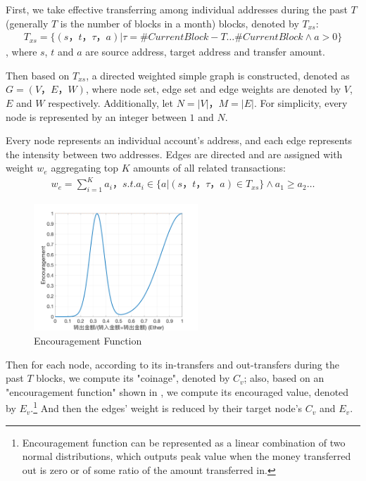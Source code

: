 First, we take effective transferring among  individual addresses during the past $T$ (generally $T$ is the number of blocks in a month) blocks, denoted by $T_{xs}$:
\begin{align}
T_{xs} = \{(s，t，\tau， a)| \tau = \#CurrentBlock-T \dots \#CurrentBlock \land a > 0 \}
\end{align}
, where $s$, $t$ and $a$ are source address, target address and transfer amount.

Then based on $T_{xs}$, a directed weighted simple graph is constructed, denoted as $G=(V， E， W)$, where node set, edge set and edge weights are denoted by $V$, $E$ and $W$ respectively. Additionally, let $N = |V|$，$M = |E|$. For simplicity, every node is represented by an integer between $1$ and $N$.

Every node represents an individual account's address, and each edge represents the intensity between two addresses. Edges are directed and are assigned with weight $w_e$ aggregating top $K$ amounts of all related transactions:
\begin{align}\label{formula:edgeweight}
w_e = \sum_{i=1}^K a_i， s.t. a_i \in \{a|(s，t，\tau，a) \in T_{xs} \} \land a_1 \geq a_2 \dots
\end{align}

\begin{figure}[h]
\centering
	\includegraphics[width=0.55\textwidth]{figs/encouragement.png}
	\caption{Encouragement Function}\label{fig:encouragement}
\end{figure}

Then for each node, according to its in-transfers and out-transfers during the past $T$ blocks, we compute its "coinage", denoted by $C_v$; also, based on an "encouragement function" shown in , we compute its encouraged value, denoted by $E_v$.\footnote{Encouragement function can be represented as a linear combination of two normal distributions, which outputs peak value when the money transferred out is zero or of some ratio of the amount transferred in.} And then the edges' weight is reduced by their target node's $C_v$ and $E_v$.

